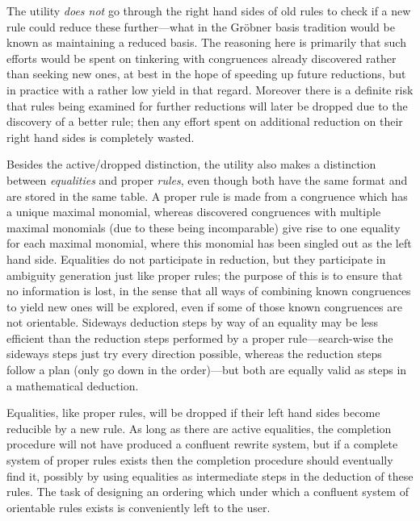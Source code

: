 \documentclass{article}
\theoremstyle{definition}
\begin{document}
The utility \emph{does not} go through the right hand sides of old 
rules to check if a new rule could reduce these further---what in the 
Gr\"obner basis tradition would be known as maintaining a reduced 
basis. The reasoning here is primarily that such efforts would be 
spent on tinkering with congruences already discovered rather than 
seeking new ones, at best in the hope of speeding up future 
reductions, but in practice with a rather low yield in that regard. 
Moreover there is a definite risk that rules being examined for 
further reductions will later be dropped due to the discovery of a 
better rule; then any effort spent on additional reduction on their 
right hand sides is completely wasted.

Besides the active\slash dropped distinction, the utility also makes 
a distinction between \emph{equalities} and proper \emph{rules}, even 
though both have the same format and are stored in the same table. A 
proper rule is made from a congruence which has a unique maximal 
monomial, whereas discovered congruences with multiple maximal 
monomials (due to these being incomparable) give rise to one equality 
for each maximal monomial, where this monomial has been singled out 
as the left hand side. Equalities do not participate in reduction, 
but they participate in ambiguity generation just like proper rules; 
the purpose of this is to ensure that no information is lost, in the 
sense that all ways of combining known congruences to yield new ones 
will be explored, even if some of those known congruences are not 
orientable. Sideways deduction steps by way of an equality may be 
less efficient than the reduction steps performed by a proper 
rule---search-wise the sideways steps just try every direction 
possible, whereas the reduction steps follow a plan (only go down in 
the order)---but both are equally valid as steps in a mathematical 
deduction.

Equalities, like proper rules, will be dropped if their left hand 
sides become reducible by a new rule. As long as there are active 
equalities, the completion procedure will not have produced a 
confluent rewrite system, but if a complete system of proper rules 
exists then the completion procedure should eventually find it, 
possibly by using equalities as intermediate steps in the deduction 
of these rules. The task of designing an ordering which under which a 
confluent system of orientable rules exists is conveniently left to 
the user.
\end{document}
